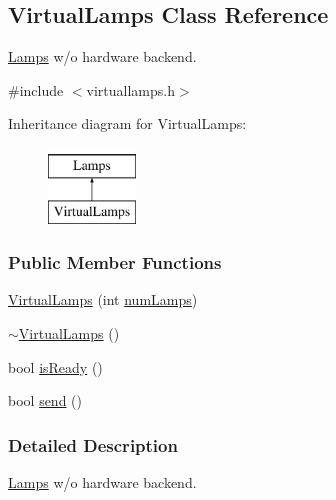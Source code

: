 \hypertarget{classVirtualLamps}{\subsection{\-Virtual\-Lamps \-Class \-Reference}
\label{classVirtualLamps}
}


\hyperlink{classLamps}{\-Lamps} w/o hardware backend.  




{\ttfamily \#include $<$virtuallamps.\-h$>$}

\-Inheritance diagram for \-Virtual\-Lamps\-:\begin{figure}[H]
\begin{center}
\leavevmode
\includegraphics[height=2.000000cm]{classVirtualLamps}
\end{center}
\end{figure}
\subsubsection*{\-Public \-Member \-Functions}
\begin{DoxyCompactItemize}
\item 
\hyperlink{classVirtualLamps_affc72765153ab552943f9977de9d0322}{\-Virtual\-Lamps} (int \hyperlink{classLamps_a64146e584dfa86281df86a37dd7cb772}{num\-Lamps})
\item 
\hyperlink{classVirtualLamps_a4341fd24507ab5d860baa894e960c26c}{$\sim$\-Virtual\-Lamps} ()
\item 
bool \hyperlink{classVirtualLamps_ad1e55b2045b9bf34bc085fc79f47ef90}{is\-Ready} ()
\item 
bool \hyperlink{classVirtualLamps_a0b1e1847c16c5283ad95c29f9142bbc9}{send} ()
\end{DoxyCompactItemize}


\subsubsection{\-Detailed \-Description}
\hyperlink{classLamps}{\-Lamps} w/o hardware backend. 


